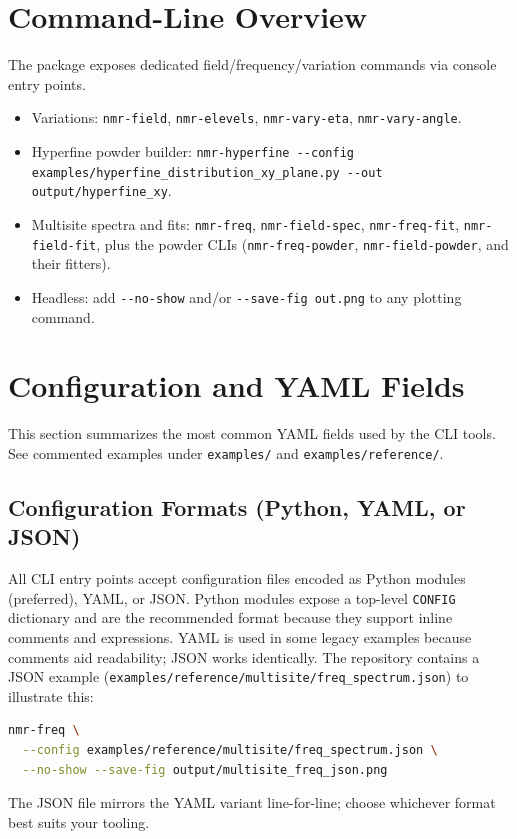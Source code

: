 \documentclass[12pt]{article}
\begin{document}
\section{Command-Line Overview}
The package exposes dedicated field/frequency/variation commands via console entry points.
\begin{itemize}
  \item Variations: \verb|nmr-field|, \verb|nmr-elevels|, \verb|nmr-vary-eta|, \verb|nmr-vary-angle|.
\item Hyperfine powder builder: \verb|nmr-hyperfine --config examples/hyperfine_distribution_xy_plane.py --out output/hyperfine_xy|.
  \item Multisite spectra and fits: \verb|nmr-freq|, \verb|nmr-field-spec|, \verb|nmr-freq-fit|, \verb|nmr-field-fit|, plus the powder CLIs (\verb|nmr-freq-powder|, \verb|nmr-field-powder|, and their fitters).
  \item Headless: add \verb|--no-show| and/or \verb|--save-fig out.png| to any plotting command.
\end{itemize}

\section{Configuration and YAML Fields}
This section summarizes the most common YAML fields used by the CLI tools. See commented examples under \verb|examples/| and \verb|examples/reference/|.

\subsection{Configuration Formats (Python, YAML, or JSON)}
All CLI entry points accept configuration files encoded as Python modules (preferred), YAML, or JSON. Python modules expose a top-level \verb|CONFIG| dictionary and are the recommended format because they support inline comments and expressions. YAML is used in some legacy examples because comments aid readability; JSON works identically. The repository contains a JSON example (\verb|examples/reference/multisite/freq_spectrum.json|) to illustrate this:
\begin{lstlisting}[language=bash]
nmr-freq \
  --config examples/reference/multisite/freq_spectrum.json \
  --no-show --save-fig output/multisite_freq_json.png
\end{lstlisting}
The JSON file mirrors the YAML variant line-for-line; choose whichever format best suits your tooling.
\end{document}
